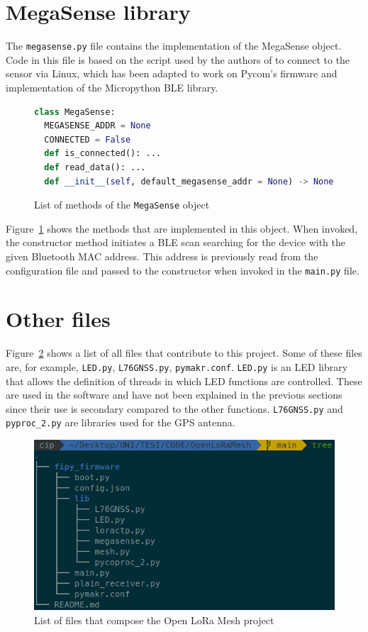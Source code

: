 	\section{MegaSense library}\label{subsec:megasense_lib}

		The \texttt{megasense.py} file contains the implementation of the MegaSense object.
		Code in this file is based on the script used by the authors of \cite{megasense} to connect to the sensor via Linux, which has been adapted to work on Pycom's firmware and implementation of the Micropython BLE library.
		
		\begin{figure}[h]
			\begin{lstlisting}[language=python]
class MegaSense:
  MEGASENSE_ADDR = None
  CONNECTED = False
  def is_connected(): ...
  def read_data(): ...
  def __init__(self, default_megasense_addr = None) -> None: ...
			\end{lstlisting}
			\caption{List of methods of the \texttt{MegaSense} object}
			\label{code:megasense_lib_function}
		\end{figure}
	
		Figure~\ref{code:megasense_lib_function} shows the methods that are implemented in this object.
		When invoked, the constructor method initiates a BLE scan searching for the device with the given Bluetooth MAC address.
		This address is previously read from the configuration file and passed to the constructor when invoked in the \texttt{main.py} file.
		
	\section{Other files}
	
		Figure~\ref{img:files} shows a list of all files that contribute to this project.
		Some of these files are, for example, \texttt{LED.py}, \texttt{L76GNSS.py}, \texttt{pymakr.conf}.
		\texttt{LED.py} is an LED library that allows the definition of threads in which LED functions are controlled.
		These are used in the software and have not been explained in the previous sections since their use is secondary compared to the other functions.
		\texttt{L76GNSS.py} and \texttt{pyproc\_2.py} are libraries used for the GPS antenna.
		
		\begin{figure}[h]
			\centering
			\includegraphics[width=.8\textwidth]{resources/img/chap5/tree_files}
			\caption{List of files that compose the Open LoRa Mesh project}
			\label{img:files}
		\end{figure}

